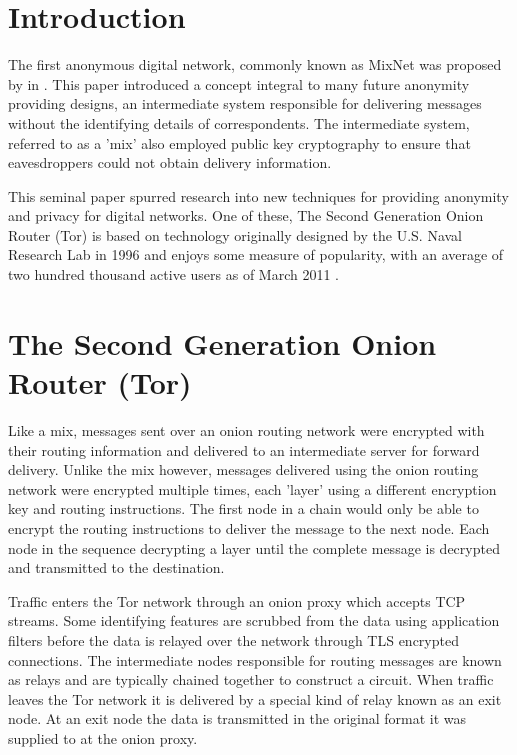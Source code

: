 \documentclass[conference]{IEEEtran}
\begin{document}
\section{Introduction}

The first anonymous digital network, commonly known as MixNet was proposed by
\citeauthor{Chaum:1981p296} in 
\parencite{Chaum:1981p296}. This paper introduced a concept integral to many
future anonymity providing designs, an intermediate system responsible for
delivering messages without the identifying details of correspondents. The
intermediate system, referred to as a 'mix' also employed public key
cryptography to ensure that eavesdroppers could not obtain delivery information.

This seminal paper spurred research into new techniques for providing anonymity
and privacy for digital networks. One of these, The Second Generation Onion
Router (Tor) is based on technology originally designed by the U.S. Naval
Research Lab in 1996 \parencite{Goldschlag:1996wy} and enjoys some measure of
popularity, with an average of two hundred thousand active users as of March
2011 \parencite{The-Tor-Project-Inc.:2011fk}.

\section{The Second Generation Onion Router (Tor)}

Like a mix, messages sent over an onion routing network were encrypted with
their routing information and delivered to an intermediate server for forward
delivery.  Unlike the mix however, messages delivered using the onion routing
network were encrypted multiple times, each 'layer' using a different
encryption key and routing instructions. The first node in a chain would only
be able to encrypt the routing instructions to deliver the message to the next
node. Each node in the sequence decrypting a layer until the complete message
is decrypted and transmitted to the destination.

Traffic enters the Tor network through an onion proxy which accepts TCP streams.
Some identifying features are scrubbed from the data using application filters
before the data is relayed over the network through TLS \parencite{website:TLS}
encrypted connections. The intermediate nodes responsible for routing messages
are known as relays and are typically chained together to construct a circuit.
When traffic leaves the Tor network it is delivered by a special kind of relay
known as an exit node. At an exit node the data is transmitted in the original
format it was supplied to at the onion proxy.
\end{document}
